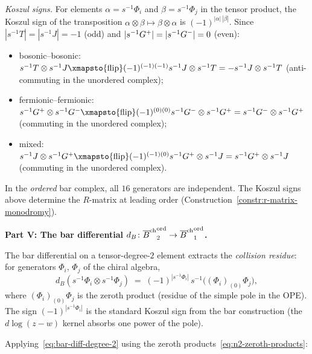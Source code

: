 \begin{computation}
\emph{Koszul signs.}
For elements $\alpha = s^{-1}\Phi_i$ and
$\beta = s^{-1}\Phi_j$ in the tensor product, the
Koszul sign of the transposition
$\alpha\otimes\beta\mapsto\beta\otimes\alpha$ is
$(-1)^{|\alpha|\,|\beta|}$. Since
$|s^{-1}T|=|s^{-1}J|=-1$ (odd) and
$|s^{-1}G^+|=|s^{-1}G^-|=0$ (even):
\begin{itemize}
\item bosonic--bosonic:
$s^{-1}T\otimes s^{-1}J \xmapsto{\text{flip}}
(-1)^{(-1)(-1)}s^{-1}J\otimes s^{-1}T
= -s^{-1}J\otimes s^{-1}T$
(anti-commuting in the unordered complex);
\item fermionic--fermionic:
$s^{-1}\Gp\otimes s^{-1}\Gm \xmapsto{\text{flip}}
(-1)^{(0)(0)}s^{-1}\Gm\otimes s^{-1}\Gp
= s^{-1}\Gm\otimes s^{-1}\Gp$
(commuting in the unordered complex);
\item mixed:
$s^{-1}J\otimes s^{-1}\Gp \xmapsto{\text{flip}}
(-1)^{(-1)(0)}s^{-1}\Gp\otimes s^{-1}J
= s^{-1}\Gp\otimes s^{-1}J$
(commuting in the unordered complex).
\end{itemize}
In the \emph{ordered} bar complex, all $16$ generators are
independent. The Koszul signs above determine the
$R$-matrix at leading order
(Construction~\ref{constr:r-matrix-monodromy}).

\medskip
\noindent\textbf{Part V: The bar differential
$d_B\colon{\overline{B}^{\mathrm{ch}}}^{\mathrm{ord}}_2\to
{\overline{B}^{\mathrm{ch}}}^{\mathrm{ord}}_1$.}

The bar differential on a tensor-degree-$2$ element extracts
the \emph{collision residue}: for generators $\Phi_i$,
$\Phi_j$ of the chiral algebra,
\begin{equation}\label{eq:bar-diff-degree-2}
d_B(s^{-1}\Phi_i\otimes s^{-1}\Phi_j)
\;=\;
(-1)^{|s^{-1}\Phi_i|}\,
s^{-1}\bigl((\Phi_i)_{(0)}\Phi_j\bigr),
\end{equation}
where $(\Phi_i)_{(0)}\Phi_j$ is the zeroth product (residue of
the simple pole in the OPE). The sign
$(-1)^{|s^{-1}\Phi_i|}$ is the standard Koszul sign from
the bar construction (the $d\log(z{-}w)$ kernel absorbs
one power of the pole).

Applying~\eqref{eq:bar-diff-degree-2}
using the zeroth products~\eqref{eq:n2-zeroth-products}:


\end{computation}
